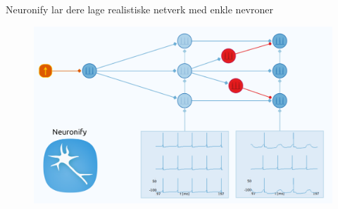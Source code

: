 \documentclass[presentation]{beamer}
\begin{document}
\begin{frame}{Neuronify lar dere lage realistiske netverk med enkle nevroner}
   \begin{figure}
     {\includegraphics[width=1\textwidth]{neuronify_network.png}}
\end{figure}
\end{frame}
\end{document}
